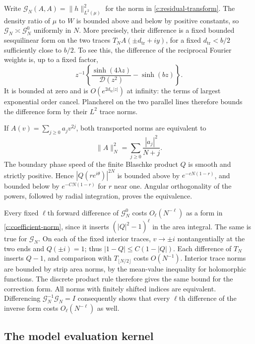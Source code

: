 Write $\mathcal G_N(A,A)=\|h\|_{L^2(\mu)}^2$ for the norm in
\eqref{c:residual-transform}.  The density ratio of $\mu$ to $W$ is
bounded above and below by positive constants, so
$\mathcal G_N\asymp\mathcal G_N^0$ uniformly in $N$.
More precisely, their difference is a fixed bounded sesquilinear form
on the two traces $T_NA(\pm d_{\mathrm{tr}}+iy)$, for a fixed $d_{\mathrm{tr}}<b/2$ sufficiently
close to $b/2$.  To see this, the difference of the reciprocal Fourier
weights is, up to a fixed factor,
\[
 z^{-1}\left\{\frac{\sinh(4\lambda z)}{\mathcal D(z^2)}
                    -\sinh(bz)\right\}.
\]
It is bounded at zero and is $O(e^{2d_{\mathrm{tr}}|z|})$ at infinity: the terms of
largest exponential order cancel.  Plancherel on the two parallel
lines therefore bounds the difference form by their $L^2$ trace norms.

If $A(v)=\sum_{j\ge0}a_jv^{2j}$, both transported norms are equivalent
to
\begin{equation}\label{c:coefficient-norm}
 \|A\|_N^2=\sum_{j\ge0}\frac{|a_j|^2}{N+j}.
\end{equation}
The boundary phase speed of the finite Blaschke product $Q$ is smooth
and strictly positive.  Hence $|Q(re^{i\theta})|^{2N}$ is bounded
above by $e^{-cN(1-r)}$, and bounded below by
$e^{-CN(1-r)}$ for $r$ near one.  Angular orthogonality of the powers,
followed by radial integration, proves the equivalence.

Every fixed $\ell$th forward difference of $\mathcal G_N^0$ costs
$O_\ell(N^{-\ell})$ as a form in \eqref{c:coefficient-norm}, since
it inserts $(|Q|^2-1)^\ell$ in the area integral.  The same is true
for $\mathcal G_N$.  On each of the fixed interior traces,
$v\to\pm i$ nontangentially at the two ends and $Q(\pm i)=1$; thus
$|1-Q|\le C(1-|Q|)$.  Each difference of $T_N$ inserts $Q-1$,
and comparison with $T_{\lfloor N/2\rfloor}$ costs $O(N^{-1})$.
Interior trace norms are bounded by strip area norms, by the mean-value
inequality for holomorphic functions.  The discrete product rule
therefore gives the same bound for the correction form.  All norms
with finitely shifted indices are equivalent.  Differencing
$\mathcal G_N^{-1}\mathcal G_N=I$ consequently shows that every
$\ell$th difference of the inverse form costs $O_\ell(N^{-\ell})$
as well.

\subsection{The model evaluation kernel}

